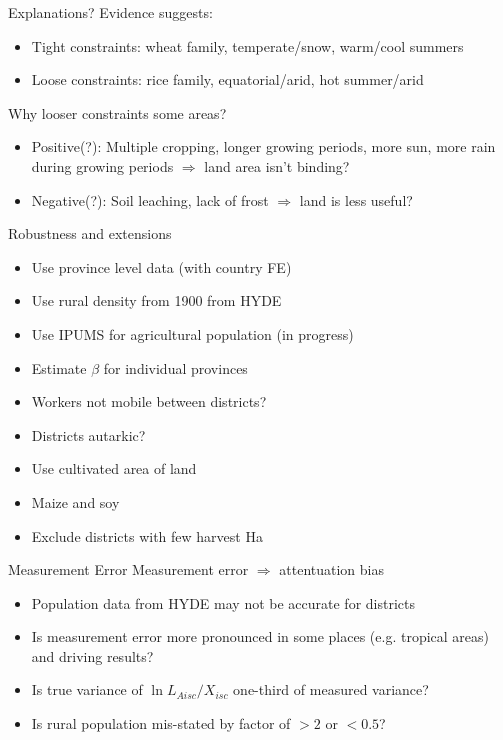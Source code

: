 \documentclass[10pt, xcolor=dvipsnames]{beamer}
\begin{document}
\begin{frame}{Explanations?}
Evidence suggests:
\begin{itemize}
  \item Tight constraints: wheat family, temperate/snow, warm/cool summers
  \item Loose constraints: rice family, equatorial/arid, hot summer/arid
\end{itemize}

\vspace{.2cm} Why looser constraints some areas?
\begin{itemize}
  \item Positive(?): Multiple cropping, longer growing periods, more sun, more rain during growing periods $\Rightarrow$ land area isn't binding?
  \item Negative(?): Soil leaching, lack of frost $\Rightarrow$ land is less useful?
\end{itemize}
\end{frame}

\begin{frame}{Robustness and extensions}\label{robustness}
\begin{itemize}
  \item Use province level data (with country FE) \hyperlink{regprov}{}
  \item Use rural density from 1900 from HYDE \hyperlink{reg1900}{}
  \item Use IPUMS for agricultural population (in progress)
  \item Estimate $\beta$ for individual provinces \hyperlink{prov}{}
  \item Workers not mobile between districts? \hyperlink{nonmobile}{}
  \item Districts autarkic? \hyperlink{autarky}{}
  \item Use cultivated area of land \hyperlink{cultreg}{}
  \item Maize and soy \hyperlink{othercrop}{}
  \item Exclude districts with few harvest Ha \hyperlink{harvarea}{}
\end{itemize}
\end{frame}

\begin{frame}{Measurement Error}
Measurement error $\Rightarrow$ attentuation bias
\begin{itemize}
  \item Population data from HYDE may not be accurate for districts
  \item Is measurement error more pronounced in some places (e.g. tropical areas) and driving results?
  \item Is true variance of $\ln L_{Aisc}/X_{isc}$ one-third of measured variance?
  \item Is rural population mis-stated by factor of $>2$ or $<0.5$?
\end{itemize}
\end{frame}
\end{document}

